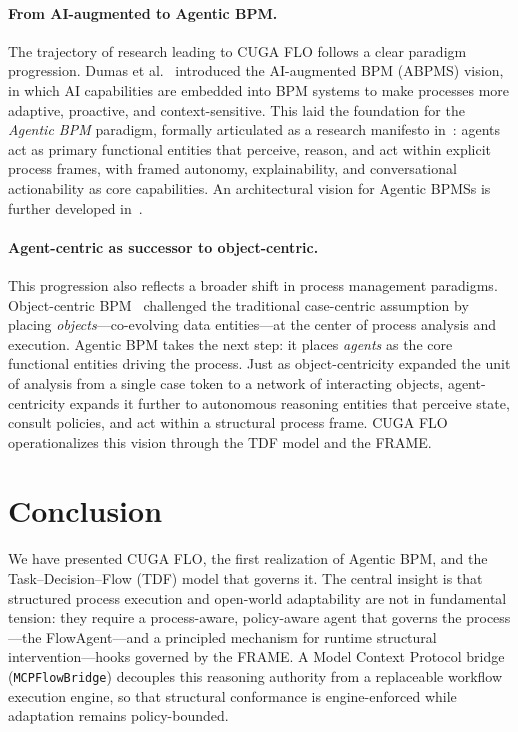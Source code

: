 \documentclass[11pt,a4paper]{article}
\begin{document}
\paragraph{From AI-augmented to Agentic BPM.}
The trajectory of research leading to CUGA FLO follows a clear paradigm
progression. Dumas et al.~\cite{dumas2023aiaugmented} introduced the AI-augmented
BPM (ABPMS) vision, in which AI capabilities are embedded into BPM systems to
make processes more adaptive, proactive, and context-sensitive. This laid the
foundation for the \emph{Agentic BPM} paradigm, formally articulated as a
research manifesto in~\cite{calvanese2026agenticbpm}: agents act as primary
functional entities that perceive, reason, and act within explicit process frames,
with framed autonomy, explainability, and conversational actionability as core
capabilities. An architectural vision for Agentic BPMSs is further developed
in~\cite{dumas2026abpms}.

\paragraph{Agent-centric as successor to object-centric.}
This progression also reflects a broader shift in process management paradigms.
Object-centric BPM~\cite{vanderaalst2026objectcentric} challenged the traditional
case-centric assumption by placing \emph{objects}---co-evolving data entities---at
the center of process analysis and execution. Agentic BPM takes the next step:
it places \emph{agents} as the core functional entities driving the process.
Just as object-centricity expanded the unit of analysis from a single case token
to a network of interacting objects, agent-centricity expands it further to
autonomous reasoning entities that perceive state, consult policies, and act
within a structural process frame. CUGA FLO operationalizes this vision through
the TDF model and the FRAME.

\section{Conclusion}
\label{sec:conclusion}

We have presented CUGA FLO, the first realization of Agentic BPM, and the
Task--Decision--Flow (TDF) model that governs it. The central insight is that
structured process execution and open-world adaptability are not in fundamental
tension: they require a process-aware, policy-aware agent that governs the process
---the FlowAgent---and a principled mechanism for runtime structural
intervention---hooks governed by the FRAME. A Model Context Protocol bridge
(\texttt{MCPFlowBridge}) decouples this reasoning authority from a replaceable
workflow execution engine, so that structural conformance is engine-enforced while
adaptation remains policy-bounded.
\end{document}
